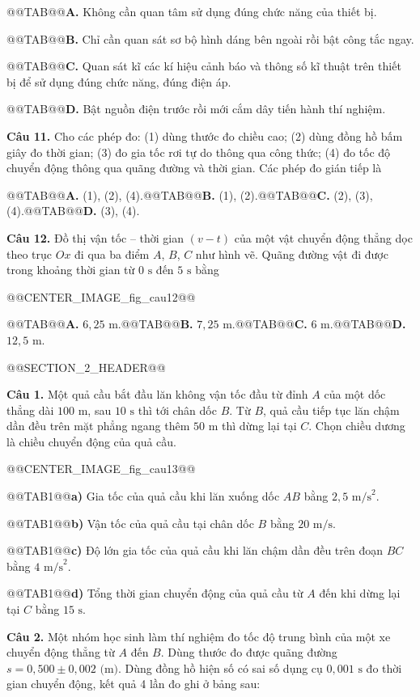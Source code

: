 \documentclass{article}
\begin{document}
@@TAB@@\textbf{A.} Không cần quan tâm sử dụng đúng chức năng của thiết bị.

@@TAB@@\textbf{B.} Chỉ cần quan sát sơ bộ hình dáng bên ngoài rồi bật công tắc ngay.

@@TAB@@\textbf{C.} Quan sát kĩ các kí hiệu cảnh báo và thông số kĩ thuật trên thiết bị để sử dụng đúng chức năng, đúng điện áp.

@@TAB@@\textbf{D.} Bật nguồn điện trước rồi mới cắm dây tiến hành thí nghiệm.

\textbf{Câu 11.} Cho các phép đo: (1) dùng thước đo chiều cao; (2) dùng đồng hồ bấm giây đo thời gian; (3) đo gia tốc rơi tự do thông qua công thức; (4) đo tốc độ chuyển động thông qua quãng đường và thời gian. Các phép đo gián tiếp là

@@TAB@@\textbf{A.} (1), (2), (4).@@TAB@@\textbf{B.} (1), (2).@@TAB@@\textbf{C.} (2), (3), (4).@@TAB@@\textbf{D.} (3), (4).

\textbf{Câu 12.} Đồ thị vận tốc -- thời gian $(v - t)$ của một vật chuyển động thẳng dọc theo trục $Ox$ đi qua ba điểm $A$, $B$, $C$ như hình vẽ. Quãng đường vật đi được trong khoảng thời gian từ $0\text{ s}$ đến $5\text{ s}$ bằng

@@CENTER_IMAGE_fig_cau12@@

@@TAB@@\textbf{A.} $6{,}25\text{ m}$.@@TAB@@\textbf{B.} $7{,}25\text{ m}$.@@TAB@@\textbf{C.} $6\text{ m}$.@@TAB@@\textbf{D.} $12{,}5\text{ m}$.

@@SECTION_2_HEADER@@

\textbf{Câu 1.} Một quả cầu bắt đầu lăn không vận tốc đầu từ đỉnh $A$ của một dốc thẳng dài $100\text{ m}$, sau $10\text{ s}$ thì tới chân dốc $B$. Từ $B$, quả cầu tiếp tục lăn chậm dần đều trên mặt phẳng ngang thêm $50\text{ m}$ thì dừng lại tại $C$. Chọn chiều dương là chiều chuyển động của quả cầu.

@@CENTER_IMAGE_fig_cau13@@

@@TAB1@@\textbf{a)} Gia tốc của quả cầu khi lăn xuống dốc $AB$ bằng $2{,}5\text{ m/s}^2$.

@@TAB1@@\textbf{b)} Vận tốc của quả cầu tại chân dốc $B$ bằng $20\text{ m/s}$.

@@TAB1@@\textbf{c)} Độ lớn gia tốc của quả cầu khi lăn chậm dần đều trên đoạn $BC$ bằng $4\text{ m/s}^2$.

@@TAB1@@\textbf{d)} Tổng thời gian chuyển động của quả cầu từ $A$ đến khi dừng lại tại $C$ bằng $15\text{ s}$.

\textbf{Câu 2.} Một nhóm học sinh làm thí nghiệm đo tốc độ trung bình của một xe chuyển động thẳng từ $A$ đến $B$. Dùng thước đo được quãng đường $s = 0{,}500 \pm 0{,}002\text{ (m)}$. Dùng đồng hồ hiện số có sai số dụng cụ $0{,}001\text{ s}$ đo thời gian chuyển động, kết quả 4 lần đo ghi ở bảng sau:
\end{document}
